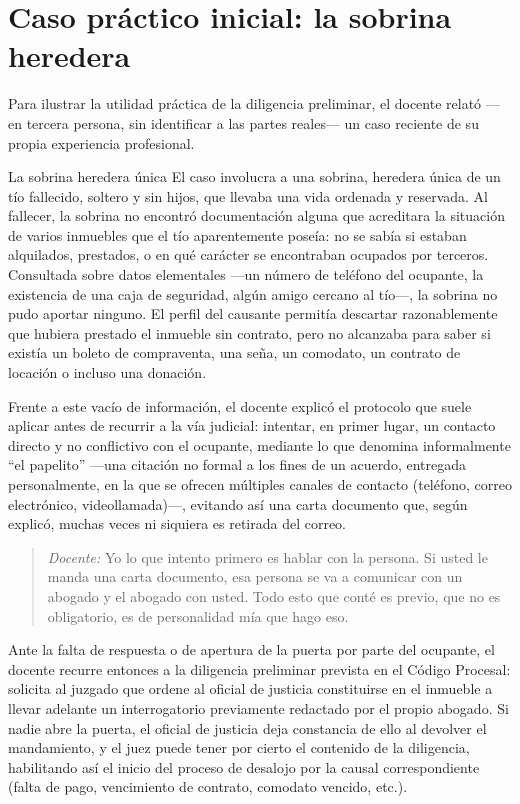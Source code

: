 \documentclass[12pt,oneside]{book}
\begin{document}
\section{Caso práctico inicial: la sobrina heredera}

Para ilustrar la utilidad práctica de la diligencia preliminar, el docente relató —en tercera persona, sin identificar a las partes reales— un caso reciente de su propia experiencia profesional.

\begin{example}{La sobrina heredera única}
El caso involucra a una sobrina, heredera única de un tío fallecido, soltero y sin hijos, que llevaba una vida ordenada y reservada. Al fallecer, la sobrina no encontró documentación alguna que acreditara la situación de varios inmuebles que el tío aparentemente poseía: no se sabía si estaban alquilados, prestados, o en qué carácter se encontraban ocupados por terceros. Consultada sobre datos elementales —un número de teléfono del ocupante, la existencia de una caja de seguridad, algún amigo cercano al tío—, la sobrina no pudo aportar ninguno. El perfil del causante permitía descartar razonablemente que hubiera prestado el inmueble sin contrato, pero no alcanzaba para saber si existía un boleto de compraventa, una seña, un comodato, un contrato de locación o incluso una donación.
\end{example}

Frente a este vacío de información, el docente explicó el protocolo que suele aplicar antes de recurrir a la vía judicial: intentar, en primer lugar, un contacto directo y no conflictivo con el ocupante, mediante lo que denomina informalmente ``el papelito'' —una citación no formal a los fines de un acuerdo, entregada personalmente, en la que se ofrecen múltiples canales de contacto (teléfono, correo electrónico, videollamada)—, evitando así una carta documento que, según explicó, muchas veces ni siquiera es retirada del correo.

\begin{quote}
\textit{Docente:} Yo lo que intento primero es hablar con la persona. Si usted le manda una carta documento, esa persona se va a comunicar con un abogado y el abogado con usted. Todo esto que conté es previo, que no es obligatorio, es de personalidad mía que hago eso.
\end{quote}

Ante la falta de respuesta o de apertura de la puerta por parte del ocupante, el docente recurre entonces a la diligencia preliminar prevista en el Código Procesal: solicita al juzgado que ordene al oficial de justicia constituirse en el inmueble a llevar adelante un interrogatorio previamente redactado por el propio abogado. Si nadie abre la puerta, el oficial de justicia deja constancia de ello al devolver el mandamiento, y el juez puede tener por cierto el contenido de la diligencia, habilitando así el inicio del proceso de desalojo por la causal correspondiente (falta de pago, vencimiento de contrato, comodato vencido, etc.).
\end{document}

